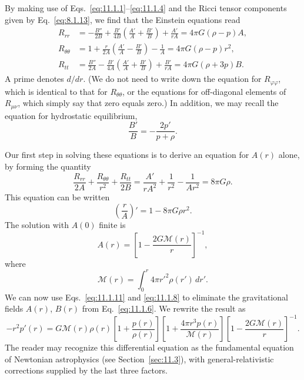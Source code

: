 By making use of Eqs.~\eqref{eq:11.1.1}--\eqref{eq:11.1.4} and the Ricci
tensor components given by Eq.~\eqref{eq:8.1.13}, we find that the Einstein
equations read
\begin{align}
  R_{rr}
  &=
  -\frac{B''}{2B}
  +\frac{B'}{4B}\left(\frac{A'}A+\frac{B'}B\right)
  +\frac{A'}{rA}
  =4\pi G(\rho-p)A,
  \tag{11.1.5}\label{eq:11.1.5}\\
  R_{\theta\theta}
  &=
  1+\frac{r}{2A}\left(\frac{A'}A-\frac{B'}B\right)-\frac1A
  =4\pi G(\rho-p)r^2,
  \tag{11.1.6}\label{eq:11.1.6}\\
  R_{tt}
  &=
  \frac{B''}{2A}
  -\frac{B'}{4A}\left(\frac{A'}A+\frac{B'}B\right)
  +\frac{B'}{rA}
  =4\pi G(\rho+3p)B.
  \tag{11.1.7}\label{eq:11.1.7}
\end{align}
A prime denotes \(d/dr\). (We do not need to write down the equation for
\(R_{\varphi\varphi}\), which is identical to that for
\(R_{\theta\theta}\), or the equations for off-diagonal elements of
\(R_{\mu\nu}\), which simply say that zero equals zero.) In addition, we may
recall the equation for hydrostatic equilibrium,
\begin{equation}
  \frac{B'}B=-\frac{2p'}{p+\rho}.
  \tag{11.1.8}\label{eq:11.1.8}
\end{equation}

Our first step in solving these equations is to derive an equation for
\(A(r)\) alone, by forming the quantity
\begin{equation}
  \frac{R_{rr}}{2A}
  +\frac{R_{\theta\theta}}{r^2}
  +\frac{R_{tt}}{2B}
  =
  \frac{A'}{rA^2}+\frac1{r^2}-\frac1{Ar^2}
  =8\pi G\rho.
  \tag{11.1.9}\label{eq:11.1.9}
\end{equation}
This equation can be written
\begin{equation}
  \left(\frac rA\right)'=1-8\pi G\rho r^2.
  \tag{11.1.10}\label{eq:11.1.10}
\end{equation}
The solution with \(A(0)\) finite is
\begin{equation}
  A(r)=\left[1-\frac{2G\mathcal{M}(r)}r\right]^{-1},
  \tag{11.1.11}\label{eq:11.1.11}
\end{equation}
where
\begin{equation}
  \mathcal{M}(r)=\int_0^r4\pi r'^2\rho(r')\,dr'.
  \tag{11.1.12}\label{eq:11.1.12}
\end{equation}
We can now use Eqs.~\eqref{eq:11.1.11} and \eqref{eq:11.1.8} to eliminate
the gravitational fields \(A(r)\), \(B(r)\) from
Eq.~\eqref{eq:11.1.6}. We rewrite the result as
\begin{equation}
  -r^2p'(r)
  =
  G\mathcal{M}(r)\rho(r)
  \left[1+\frac{p(r)}{\rho(r)}\right]
  \left[1+\frac{4\pi r^3p(r)}{\mathcal{M}(r)}\right]
  \left[1-\frac{2G\mathcal{M}(r)}r\right]^{-1}.
  \tag{11.1.13}\label{eq:11.1.13}
\end{equation}
The reader may recognize this differential equation as the fundamental
equation of Newtonian astrophysics (see Section~\ref{sec:11.3}), with
general-relativistic corrections supplied by the last three factors.

